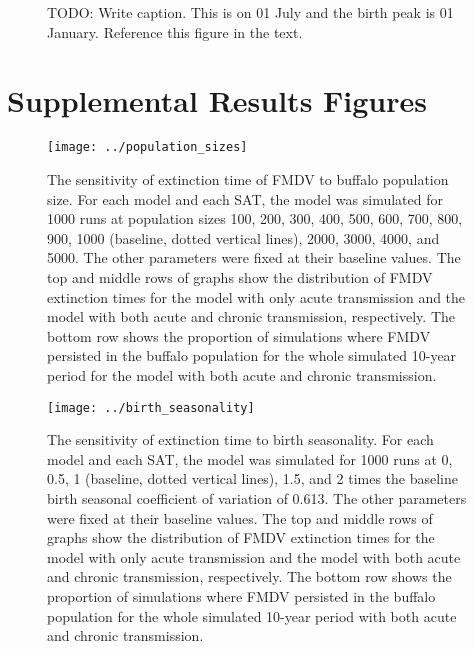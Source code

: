 \documentclass[12pt]{article}
\newcounter{chapter}
\newcommand{\appendixlabel}{S}
\renewcommand{\thefigure}{\appendixlabel\thechapter.\arabic{figure}}
\begin{document}
\begin{figure}
  \centering
  \begin{sansmath}
    
  \end{sansmath}
  \caption{TODO: Write caption.
    This is on 01 July and the birth peak is 01 January.
    Reference this figure in the text.}
  \label{fig:stable_age_distribution}
\end{figure}


\printbibliography


\newpage
\appendix
\section*{Supplemental Results Figures}
\setcounter{figure}{\value{chapter}}
\renewcommand{\thefigure}{\appendixlabel\arabic{figure}}
\renewcommand{\HyperDestNameFilter}[1]{chapter-#1}


\begin{figure}
  \centering
  \texttt{[image: ../population\_sizes]}
  \caption{The sensitivity of extinction time of FMDV to buffalo
    population size.
    For each model and each SAT, the model was simulated for 1000 runs
    at population sizes 100, 200, 300, 400, 500, 600, 700, 800, 900,
    1000 (baseline, dotted vertical lines), 2000, 3000, 4000, and
    5000.
    The other parameters were fixed at their baseline values.
    The top and middle rows of graphs show the distribution of
    FMDV extinction times for the model with only acute transmission
    and the model with both acute and chronic transmission,
    respectively.
    The bottom row shows the proportion of simulations where FMDV
    persisted in the buffalo population for the whole simulated
    10-year period for the model with both acute and chronic
    transmission.}
\end{figure}

\begin{figure}
  \centering
  \texttt{[image: ../birth\_seasonality]}
  \caption{The sensitivity of extinction time to birth seasonality.
    For each model and each SAT, the model was simulated for
    1000 runs at 0, 0.5, 1 (baseline, dotted vertical lines), 1.5, and
    2 times the baseline birth seasonal coefficient of variation of
    0.613.
    The other parameters were fixed at their baseline values.
    The top and middle rows of graphs show the distribution of
    FMDV extinction times for the model with only acute transmission
    and the model with both acute and chronic transmission,
    respectively.
    The bottom row shows the proportion of simulations where FMDV
    persisted in the buffalo population for the whole simulated
    10-year period with both acute and chronic transmission.}
\end{figure}
\end{document}
